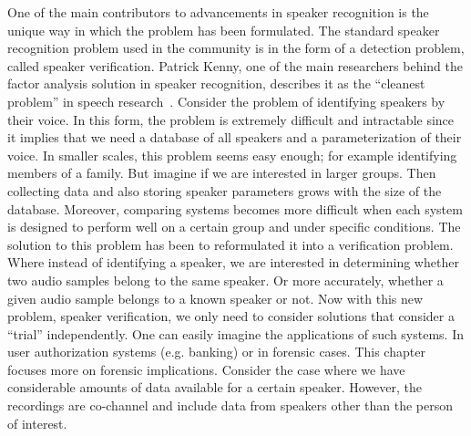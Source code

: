 One of the main contributors to advancements in speaker recognition is the unique way in which the problem has been formulated. 
The standard speaker recognition problem used in the community is in the form of a detection problem, called speaker verification. 
Patrick Kenny, one of the main researchers behind the factor analysis solution in speaker recognition, describes it as the ``cleanest problem'' in speech research~\cite{anintroductiontoapplicationindependentevaluationofspeakerrecognitionsystems}. 
Consider the problem of identifying speakers by their voice. 
In this form, the problem is extremely difficult and intractable since it implies that we need a database of all speakers and a parameterization of their voice. 
In smaller scales, this problem seems easy enough; for example identifying members of a family. 
But imagine if we are interested in larger groups. 
Then collecting data and also storing speaker parameters grows with the size of the database. 
Moreover, comparing systems becomes more difficult when each system is designed to perform well on a certain group and under specific conditions. 
The solution to this problem has been to reformulated it into a verification problem. 
Where instead of identifying a speaker, we are interested in determining whether two audio samples belong to the same speaker. 
Or more accurately, whether a given audio sample belongs to a known speaker or not. 
Now with this new problem, speaker verification, we only need to consider solutions that consider a ``trial'' independently. 
One can easily imagine the applications of such systems. 
In user authorization systems (e.g. banking) or in forensic cases. 
This chapter focuses more on forensic implications. 
Consider the case where we have considerable amounts of data available for a certain speaker. 
However, the recordings are co-channel and include data from speakers other than the person of interest. 
